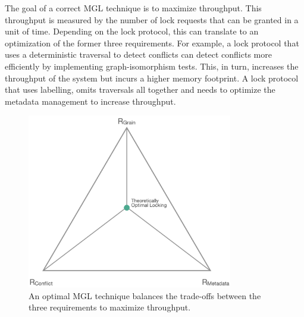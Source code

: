 The goal of a correct MGL technique is to maximize throughput. This throughput is measured by the number of lock requests that can be granted in a unit of time. Depending on the lock protocol, this can translate to an optimization of the former three requirements. For example, a lock protocol that uses a deterministic traversal to detect conflicts can detect conflicts more efficiently by implementing graph-isomorphism tests. This, in turn, increases the throughput of the system but incurs a higher memory footprint. A lock protocol that uses labelling, omits traversals all together and needs to optimize the metadata management to increase throughput. 

\begin{figure}[h]
    \centering
    \captionsetup{justification=centering}
    \includegraphics[width=0.8\textwidth]{figures/IdealMGLTechnique.png}
    \caption{An optimal MGL technique balances the trade-offs between the three requirements to maximize throughput.}
    \label{fig:lock_throughput}
\end{figure}






